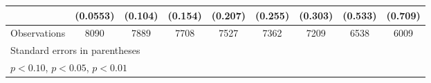 \begin{table}[htbp]
\begin{tabular}{l*{8}{c}}
                    &    (0.0553)         &     (0.104)         &     (0.154)         &     (0.207)         &     (0.255)         &     (0.303)         &     (0.533)         &     (0.709)         \\
\hline
Observations        &        8090         &        7889         &        7708         &        7527         &        7362         &        7209         &        6538         &        6009         \\
\hline\hline
\multicolumn{9}{l}{\footnotesize Standard errors in parentheses}\\
\multicolumn{9}{l}{\footnotesize \sym{*} \(p<0.10\), \sym{**} \(p<0.05\), \sym{***} \(p<0.01\)}\\
\end{tabular}
\end{table}
